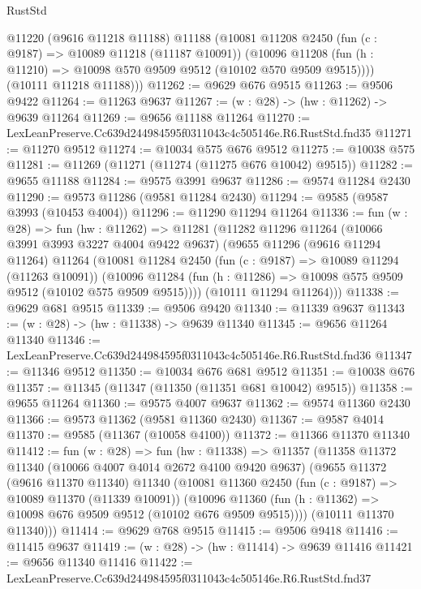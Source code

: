 \begin{lexlean}{RustStd}
\begin{coremodule}
        @11220
        (@9616 @11218 @11188)
        @11188
        (@10081
          @11208
          @2450
          (fun (c : @9187) => @10089 @11218 (@11187 @10091))
          (@10096 @11208 (fun (h : @11210) => @10098 @570 @9509 @9512 (@10102 @570 @9509 @9515))))
        (@10111 @11218 @11188)))
@11262 := @9629 @676 @9515
@11263 := @9506 @9422
@11264 := @11263 @9637
@11267 := (w : @28) -> (hw : @11262) -> @9639 @11264
@11269 := @9656 @11188 @11264
@11270 := LexLeanPreserve.Cc639d244984595f0311043c4c505146e.R6.RustStd.fnd35
@11271 := @11270 @9512
@11274 := @10034 @575 @676 @9512
@11275 := @10038 @575
@11281 := @11269 (@11271 (@11274 (@11275 @676 @10042) @9515))
@11282 := @9655 @11188
@11284 := @9575 @3991 @9637
@11286 := @9574 @11284 @2430
@11290 := @9573 @11286 (@9581 @11284 @2430)
@11294 := @9585 (@9587 @3993 (@10453 @4004))
@11296 := @11290 @11294 @11264
@11336 := fun (w : @28) =>
  fun (hw : @11262) =>
  @11281
    (@11282
      @11296
      @11264
      (@10066 @3991 @3993 @3227 @4004 @9422 @9637)
      (@9655
        @11296
        (@9616 @11294 @11264)
        @11264
        (@10081
          @11284
          @2450
          (fun (c : @9187) => @10089 @11294 (@11263 @10091))
          (@10096 @11284 (fun (h : @11286) => @10098 @575 @9509 @9512 (@10102 @575 @9509 @9515))))
        (@10111 @11294 @11264)))
@11338 := @9629 @681 @9515
@11339 := @9506 @9420
@11340 := @11339 @9637
@11343 := (w : @28) -> (hw : @11338) -> @9639 @11340
@11345 := @9656 @11264 @11340
@11346 := LexLeanPreserve.Cc639d244984595f0311043c4c505146e.R6.RustStd.fnd36
@11347 := @11346 @9512
@11350 := @10034 @676 @681 @9512
@11351 := @10038 @676
@11357 := @11345 (@11347 (@11350 (@11351 @681 @10042) @9515))
@11358 := @9655 @11264
@11360 := @9575 @4007 @9637
@11362 := @9574 @11360 @2430
@11366 := @9573 @11362 (@9581 @11360 @2430)
@11367 := @9587 @4014
@11370 := @9585 (@11367 (@10058 @4100))
@11372 := @11366 @11370 @11340
@11412 := fun (w : @28) =>
  fun (hw : @11338) =>
  @11357
    (@11358
      @11372
      @11340
      (@10066 @4007 @4014 @2672 @4100 @9420 @9637)
      (@9655
        @11372
        (@9616 @11370 @11340)
        @11340
        (@10081
          @11360
          @2450
          (fun (c : @9187) => @10089 @11370 (@11339 @10091))
          (@10096 @11360 (fun (h : @11362) => @10098 @676 @9509 @9512 (@10102 @676 @9509 @9515))))
        (@10111 @11370 @11340)))
@11414 := @9629 @768 @9515
@11415 := @9506 @9418
@11416 := @11415 @9637
@11419 := (w : @28) -> (hw : @11414) -> @9639 @11416
@11421 := @9656 @11340 @11416
@11422 := LexLeanPreserve.Cc639d244984595f0311043c4c505146e.R6.RustStd.fnd37

\end{coremodule}
\end{lexlean}
